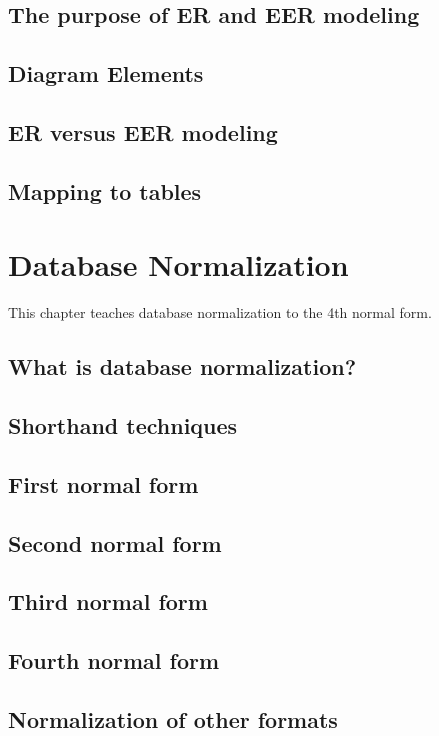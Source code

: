 \section{The purpose of ER and EER modeling}
\section{Diagram Elements}
\section{ER versus EER modeling}
\section{Mapping to tables}

\chapter{Database Normalization}
\label{chap:relational:database-normalization}
This chapter teaches database normalization to the 4th normal form.

\section{What is database normalization?}
\section{Shorthand techniques}
\section{First normal form}
\section{Second normal form}
\section{Third normal form}
\section{Fourth normal form}
\section{Normalization of other formats}

